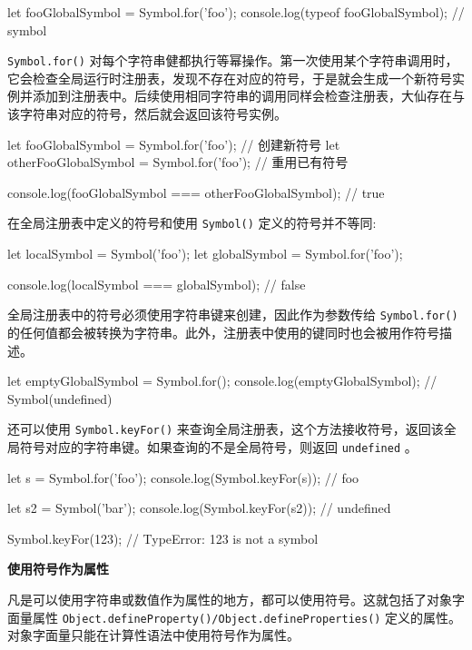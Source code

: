 \begin{JavaScript}
let fooGlobalSymbol = Symbol.for('foo');
console.log(typeof fooGlobalSymbol);    // symbol
\end{JavaScript}

\texttt{Symbol.for()} 对每个字符串健都执行等幂操作。第一次使用某个字符串调用时，它会检查全局运行时注册表，发现不存在对应的符号，于是就会生成一个新符号实例并添加到注册表中。后续使用相同字符串的调用同样会检查注册表，大仙存在与该字符串对应的符号，然后就会返回该符号实例。

\begin{JavaScript}
let fooGlobalSymbol = Symbol.for('foo');        // 创建新符号
let otherFooGlobalSymbol = Symbol.for('foo');   // 重用已有符号

console.log(fooGlobalSymbol === otherFooGlobalSymbol);  // true
\end{JavaScript}

在全局注册表中定义的符号和使用 \texttt{Symbol()} 定义的符号并不等同:

\begin{JavaScript}
let localSymbol = Symbol('foo');
let globalSymbol = Symbol.for('foo');

console.log(localSymbol === globalSymbol);  // false
\end{JavaScript}

全局注册表中的符号必须使用字符串键来创建，因此作为参数传给 \texttt{Symbol.for()} 的任何值都会被转换为字符串。此外，注册表中使用的键同时也会被用作符号描述。

\begin{JavaScript}
let emptyGlobalSymbol = Symbol.for();
console.log(emptyGlobalSymbol);     // Symbol(undefined)
\end{JavaScript}

还可以使用 \texttt{Symbol.keyFor()} 来查询全局注册表，这个方法接收符号，返回该全局符号对应的字符串键。如果查询的不是全局符号，则返回 \texttt{undefined} 。

\begin{JavaScript}
let s = Symbol.for('foo');
console.log(Symbol.keyFor(s));      // foo

let s2 = Symbol('bar');
console.log(Symbol.keyFor(s2));     // undefined

Symbol.keyFor(123);                 // TypeError: 123 is not a symbol
\end{JavaScript}

\noindent\textbf{使用符号作为属性}

凡是可以使用字符串或数值作为属性的地方，都可以使用符号。这就包括了对象字面量属性 \texttt{Object.defineProperty()/Object.defineProperties()} 定义的属性。对象字面量只能在计算性语法中使用符号作为属性。

